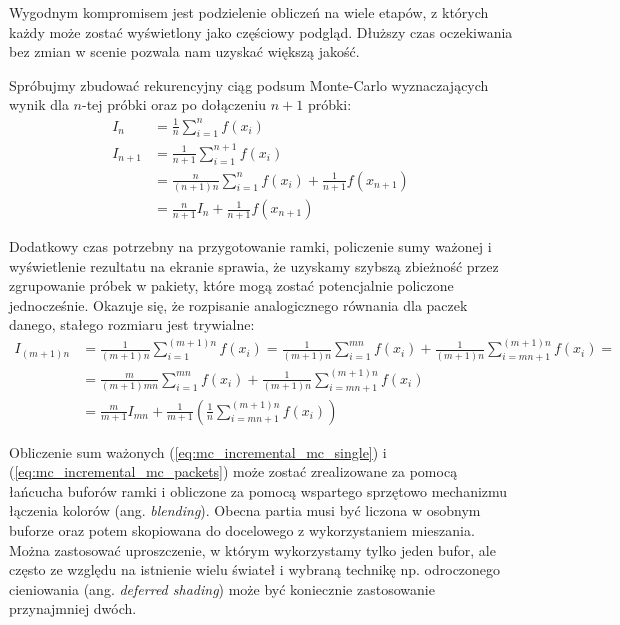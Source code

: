 \documentclass[../main.tex]{subfiles}
\begin{document}
Wygodnym kompromisem jest podzielenie obliczeń na wiele etapów, z których każdy może zostać wyświetlony jako częściowy podgląd. Dłuższy czas oczekiwania bez zmian w scenie pozwala nam uzyskać większą jakość.

Spróbujmy zbudować rekurencyjny ciąg podsum Monte-Carlo wyznaczających wynik dla $n$-tej próbki oraz po dołączeniu $n+1$ próbki:
\begin{equation}	
\begin{aligned}
I_n &= \frac{1}{n} \sum_{i=1}^{n} f(x_i) \\
I_{n+1} &= \frac{1}{n+1} \sum_{i=1}^{n+1}f(x_i) \\
	&= \frac{n}{(n+1)n} \sum_{i=1}^{n}f(x_i) + \frac{1}{n+1}f(x_{n+1}) \\
	&= \frac{n}{n+1} I_{n} + \frac{1}{n+1}f(x_{n+1})
\end{aligned}
\label{eq:mc_incremental_mc_single}
\end{equation}

Dodatkowy czas potrzebny na przygotowanie ramki, policzenie sumy ważonej i wyświetlenie rezultatu na ekranie sprawia, że uzyskamy szybszą zbieżność przez zgrupowanie próbek w pakiety, które mogą zostać potencjalnie policzone jednocześnie. Okazuje się, że rozpisanie analogicznego równania dla paczek danego, stałego rozmiaru jest trywialne:
\begin{equation}	
\begin{aligned}
  I_{(m+1)n} &= \frac{1}{(m+1)n} \sum_{i=1}^{(m+1)n} f(x_i)
  = \frac{1}{(m+1)n} \sum_{i=1}^{mn} f(x_i)
    + \frac{1}{(m+1)n} \sum_{i=mn+1}^{(m+1)n} f(x_i) = \\
  &= \frac{m}{(m+1)mn} \sum_{i=1}^{mn} f(x_i)
    + \frac{1}{(m+1)n} \sum_{i=mn+1}^{(m+1)n} f(x_i) \\
  &= \frac{m}{m+1}I_{mn}
    + \frac{1}{m+1} \left(
        \frac{1}{n} \sum_{i=mn+1}^{(m+1)n} f(x_i)
    \right)
\end{aligned}
\label{eq:mc_incremental_mc_packets}
\end{equation}

Obliczenie sum ważonych (\ref{eq:mc_incremental_mc_single}) i (\ref{eq:mc_incremental_mc_packets}) może zostać zrealizowane za pomocą łańcucha buforów ramki i obliczone za pomocą wspartego sprzętowo mechanizmu łączenia kolorów (ang. \textit{blending}). Obecna partia musi być liczona w osobnym buforze oraz potem skopiowana do docelowego z wykorzystaniem mieszania. Można zastosować uproszczenie, w którym wykorzystamy tylko jeden bufor, ale często ze względu na istnienie wielu świateł i wybraną technikę np. odroczonego cieniowania (ang. \textit{deferred shading}) może być koniecznie zastosowanie przynajmniej dwóch.
\end{document}
